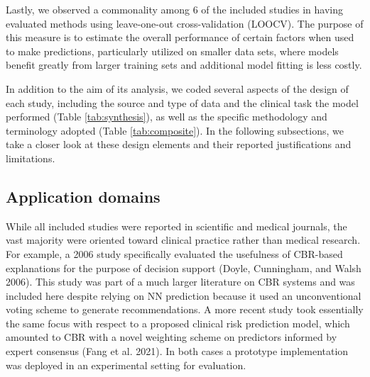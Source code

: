 \documentclass{article}
\begin{document}
Lastly, we observed a commonality among 6 of the included studies in
having evaluated methods using leave-one-out cross-validation (LOOCV).
The purpose of this measure is to estimate the overall performance of
certain factors when used to make predictions, particularly utilized on
smaller data sets, where models benefit greatly from larger training
sets and additional model fitting is less costly.

In addition to the aim of its analysis, we coded several aspects of the
design of each study, including the source and type of data and the
clinical task the model performed (Table \ref{tab:synthesis}), as well
as the specific methodology and terminology adopted (Table
\ref{tab:composite}). In the following subsections, we take a closer
look at these design elements and their reported justifications and
limitations.

\hypertarget{application-domains}{%
\subsection{Application domains}\label{application-domains}}

While all included studies were reported in scientific and medical
journals, the vast majority were oriented toward clinical practice
rather than medical research. For example, a 2006 study specifically
evaluated the usefulness of CBR-based explanations for the purpose of
decision support (Doyle, Cunningham, and Walsh 2006). This study was
part of a much larger literature on CBR systems and was included here
despite relying on NN prediction because it used an unconventional
voting scheme to generate recommendations. A more recent study took
essentially the same focus with respect to a proposed clinical risk
prediction model, which amounted to CBR with a novel weighting scheme on
predictors informed by expert consensus (Fang et al. 2021). In both
cases a prototype implementation was deployed in an experimental setting
for evaluation.
\end{document}
